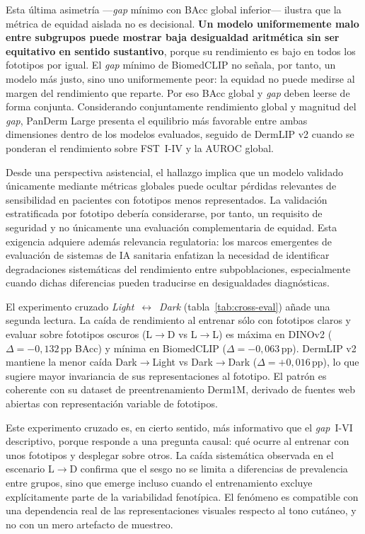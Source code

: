 Esta última asimetría ---\emph{gap} mínimo con BAcc global
inferior--- ilustra que la métrica de equidad aislada no es
decisional. \textbf{Un modelo uniformemente malo entre subgrupos puede
mostrar baja desigualdad aritmética sin ser equitativo en sentido
sustantivo}, porque su rendimiento es bajo en todos los fototipos por
igual. El \emph{gap} mínimo de BiomedCLIP no señala, por tanto, un
modelo más justo, sino uno uniformemente peor: la equidad no puede
medirse al margen del rendimiento que reparte. Por eso BAcc global y
\emph{gap} deben leerse de forma conjunta. Considerando conjuntamente
rendimiento global y magnitud del \emph{gap}, PanDerm Large presenta el
equilibrio más favorable entre ambas dimensiones dentro de los modelos
evaluados, seguido de DermLIP v2 cuando se ponderan el rendimiento sobre
FST~I-IV y la AUROC global.

Desde una perspectiva asistencial, el hallazgo implica que un modelo
validado únicamente mediante métricas globales puede ocultar pérdidas
relevantes de sensibilidad en pacientes con fototipos menos
representados. La validación estratificada por fototipo debería
considerarse, por tanto, un requisito de seguridad y no únicamente una
evaluación complementaria de equidad. Esta exigencia adquiere además
relevancia regulatoria: los marcos emergentes de evaluación de sistemas
de IA sanitaria enfatizan la necesidad de identificar degradaciones
sistemáticas del rendimiento entre subpoblaciones, especialmente cuando
dichas diferencias pueden traducirse en desigualdades diagnósticas.

El experimento cruzado \emph{Light}~$\leftrightarrow$~\emph{Dark}
(tabla~\ref{tab:cross-eval}) añade una segunda lectura. La caída de
rendimiento al entrenar sólo con fototipos claros y evaluar sobre
fototipos oscuros (L$\to$D vs L$\to$L) es máxima en DINOv2
($\Delta = -0{,}132$\,pp BAcc) y mínima en BiomedCLIP
($\Delta = -0{,}063$\,pp). DermLIP v2 mantiene la menor caída
Dark$\to$Light vs Dark$\to$Dark ($\Delta = +0{,}016$\,pp), lo que
sugiere mayor invariancia de sus representaciones al fototipo. El
patrón es coherente con su dataset de preentrenamiento Derm1M,
derivado de fuentes web abiertas con representación variable de
fototipos.

Este experimento cruzado es, en cierto sentido, más informativo que el
\emph{gap}~I-VI descriptivo, porque responde a una pregunta causal:
qué ocurre al entrenar con unos fototipos y desplegar sobre otros. La
caída sistemática observada en el escenario L$\to$D confirma que el
sesgo no se limita a diferencias de prevalencia entre grupos, sino que
emerge incluso cuando el entrenamiento excluye explícitamente parte de
la variabilidad fenotípica. El fenómeno es compatible con una
dependencia real de las representaciones visuales respecto al tono
cutáneo, y no con un mero artefacto de muestreo.

